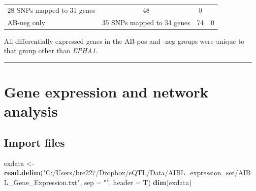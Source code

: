 \documentclass[]{article}
\newenvironment{Shaded}{\begin{snugshade}}{\end{snugshade}}
\newcommand{\KeywordTok}[1]{\textcolor[rgb]{0.13,0.29,0.53}{\textbf{#1}}}
\newcommand{\DataTypeTok}[1]{\textcolor[rgb]{0.13,0.29,0.53}{#1}}
\newcommand{\StringTok}[1]{\textcolor[rgb]{0.31,0.60,0.02}{#1}}
\newcommand{\NormalTok}[1]{#1}
\begin{document}
\begin{longtable}[]{@{}lccc@{}}
\begin{minipage}[t]{0.19\columnwidth}
28 SNPs mapped to 31 genes\strut
\end{minipage} & \begin{minipage}[t]{0.30\columnwidth}\centering\strut
48\strut
\end{minipage} & \begin{minipage}[t]{0.25\columnwidth}\centering\strut
0\strut
\end{minipage}\tabularnewline
\begin{minipage}[t]{0.15\columnwidth}\raggedright\strut
AB-neg only\strut
\end{minipage} & \begin{minipage}[t]{0.19\columnwidth}\centering\strut
35 SNPs mapped to 34 genes\strut
\end{minipage} & \begin{minipage}[t]{0.30\columnwidth}\centering\strut
74\strut
\end{minipage} & \begin{minipage}[t]{0.25\columnwidth}\centering\strut
0\strut
\end{minipage}\tabularnewline
\bottomrule
\end{longtable}

All differentially expressed genes in the AB-pos and -neg groups were
unique to that group other than \emph{EPHA1}.

\begin{center}\rule{0.5\linewidth}{\linethickness}\end{center}

\section{Gene expression and network
analysis}\label{gene-expression-and-network-analysis}

\subsection{Import files}\label{import-files-1}

\begin{Shaded}
\begin{Highlighting}[]
\NormalTok{exdata <-}\StringTok{ }\KeywordTok{read.delim}\NormalTok{(}\StringTok{"C:/Users/bre227/Dropbox/eQTL/Data/AIBL_expression_set/AIBL_Gene_Expression.txt"}\NormalTok{, }\DataTypeTok{sep =} \StringTok{""}\NormalTok{, }\DataTypeTok{header =}\NormalTok{ T)}
\KeywordTok{dim}\NormalTok{(exdata)}
\end{Highlighting}
\end{Shaded}
\end{document}
